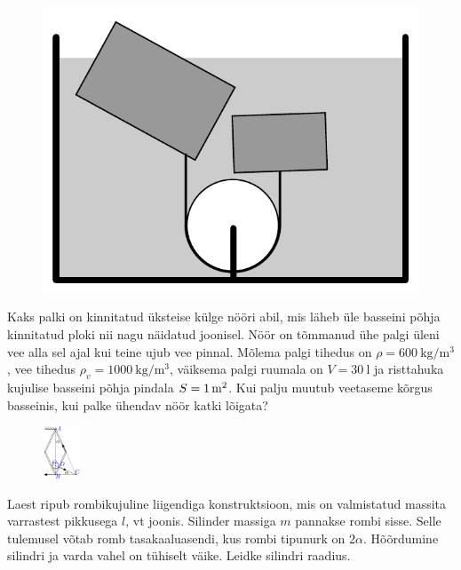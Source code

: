 \documentclass[10pt]{article}
\begin{document}
\begin{figure}
  \vspace{-25pt}
  \begin{center}
  \includegraphics[scale=0.3]{2024-v2g-07-yl.pdf}
  \vspace{-20pt}
  \end{center}
\end{figure}

Kaks palki on kinnitatud üksteise külge nööri abil, mis läheb üle basseini põhja kinnitatud ploki nii nagu näidatud joonisel. Nöör on tõmmanud ühe palgi üleni vee alla sel ajal kui teine ujub vee pinnal. Mõlema palgi tihedus on $\rho=\SI {600}{\kg \per\m\cubed}$, vee tihedus $\rho_v=\SI{1000}{\kg\per\m\cubed}$, väiksema palgi ruumala on $V=\SI{30}\litre$ ja risttahuka kujulise basseini põhja pindala  $S=\SI{1}{m\squared}$. Kui palju muutub veetaseme kõrgus basseinis, kui palke ühendav nöör katki lõigata?
\probend
\bigskip


\begin{figure}
  \vspace*{-0mm}
  \includegraphics[width = 0.1\textwidth]{2024-v3g-07-yl.pdf}
\end{figure}
Laest ripub rombikujuline liigendiga konstruktsioon, mis on valmistatud massita varrastest pikkusega $l$, vt joonis. Silinder massiga $m$ pannakse rombi sisse. Selle tulemusel võtab romb tasakaaluasendi, kus rombi tipunurk on $2\alpha$. Hõõrdumine silindri ja varda vahel on tühiselt väike. Leidke silindri raadius.
\probend
\bigskip
\end{document}
